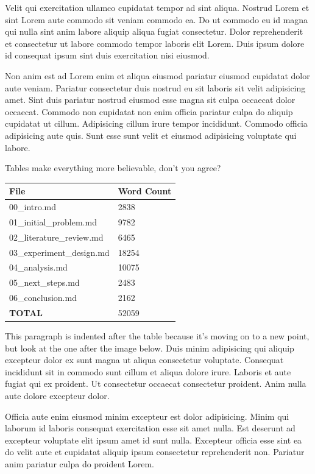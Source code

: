 \documentclass[
    12pt,
    letterpaper,
    oneside,
    noraggedright
]{turabian-researchpaper}
\begin{document}
Velit qui exercitation ullamco cupidatat tempor ad sint aliqua. Nostrud
Lorem et sint Lorem aute commodo sit veniam commodo ea. Do ut commodo eu
id magna qui nulla sint anim labore aliquip aliqua fugiat consectetur.
Dolor reprehenderit et consectetur ut labore commodo tempor laboris elit
Lorem. Duis ipsum dolore id consequat ipsum sint duis exercitation nisi
eiusmod.

Non anim est ad Lorem enim et aliqua eiusmod pariatur eiusmod cupidatat
dolor aute veniam. Pariatur consectetur duis nostrud eu sit laboris sit
velit adipisicing amet. Sint duis pariatur nostrud eiusmod esse magna
sit culpa occaecat dolor occaecat. Commodo non cupidatat non enim
officia pariatur culpa do aliquip cupidatat ut cillum. Adipisicing
cillum irure tempor incididunt. Commodo officia adipisicing aute quis.
Sunt esse sunt velit et eiusmod adipisicing voluptate qui labore.

Tables make everything more believable, don't you agree?

\begin{longtable}[]{@{}ll@{}}
\toprule()
File & Word Count \\
\midrule()
\endhead
00\_intro.md & 2838 \\
01\_initial\_problem.md & 9782 \\
02\_literature\_review.md & 6465 \\
03\_experiment\_design.md & 18254 \\
04\_analysis.md & 10075 \\
05\_next\_steps.md & 2483 \\
06\_conclusion.md & 2162 \\
\textbf{TOTAL} & 52059 \\
\bottomrule()
\end{longtable}

This paragraph is indented after the table because it's moving on to a
new point, but look at the one after the image below. Duis minim
adipisicing qui aliquip excepteur dolor ex sunt magna ut aliqua
consectetur voluptate. Consequat incididunt sit in commodo sunt cillum
et aliqua dolore irure. Laboris et aute fugiat qui ex proident. Ut
consectetur occaecat consectetur proident. Anim nulla aute dolore
excepteur dolor.

Officia aute enim eiusmod minim excepteur est dolor adipisicing. Minim
qui laborum id laboris consequat exercitation esse sit amet nulla. Est
deserunt ad excepteur voluptate elit ipsum amet id sunt nulla. Excepteur
officia esse sint ea do velit aute et cupidatat aliquip ipsum
consectetur reprehenderit non. Pariatur anim pariatur culpa do proident
Lorem.
\end{document}
